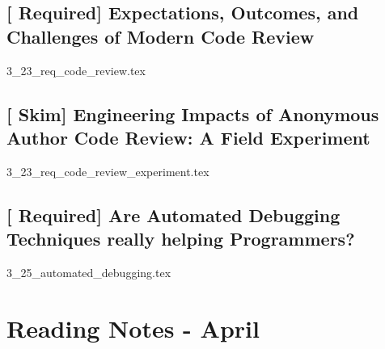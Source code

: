 \documentclass[oneside]{book}      %
\newcommand{\reqchap}[1]{\chapter{\texorpdfstring{[{\color{red} Required}] #1}{#1}}}
\newcommand{\skimchap}[1]{\chapter{\texorpdfstring{[{\color{ForestGreen} Skim}] #1}{#1}}}
\begin{document}
\begin{refsection}
    \reqchap{Expectations, Outcomes, and Challenges of Modern Code Review}
    {3_23_req_code_review.tex}
    \printbibliography[heading=subbibliography,title={References}]
\end{refsection}

\begin{refsection}
    \skimchap{Engineering Impacts of Anonymous Author Code Review: A Field Experiment}
    {3_23_req_code_review_experiment.tex}
    \printbibliography[heading=subbibliography,title={References}]
\end{refsection}

\begin{refsection}
    \reqchap{Are Automated Debugging Techniques really helping Programmers?}
    {3_25_automated_debugging.tex}
    \printbibliography[heading=subbibliography,title={References}]
\end{refsection}

\part{Reading Notes - April}
\end{document}
